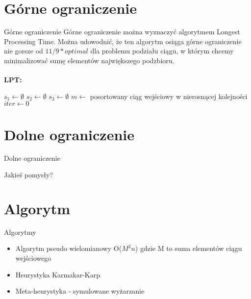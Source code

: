 \documentclass{beamer}
\begin{document}
\section{Górne ograniczenie}

\begin{frame}{Górne ograniczenie}
Górne ograniczenie można wyznaczyć algorytmem Longest Processing Time. Można udowodnić, że ten algorytm osiąga górne ograniczenie nie gorsze od $11/9*optimal$ dla problemu podziału ciągu, w którym chcemy minimalizować sumę elementów największego podzbioru.\\~\\
\textbf{LPT:}\\
\begin{algorithm}[H]
 $s_1 \gets \emptyset$\;
 $s_2 \gets \emptyset$\;
 $s_3 \gets \emptyset$\;
 $m \gets $ posortowany ciąg wejściowy w nierosnącej kolejności\;
 $iter \gets 0$\;
\end{algorithm} 

  

\end{frame}

\section{Dolne ograniczenie}

\begin{frame}{Dolne ograniczenie}

Jakieś pomysły?

\end{frame}

\section{Algorytm}

\begin{frame}{Algorytmy}


\begin{itemize}  
\item Algorytm pseudo wielomianowy O($M^2n$) gdzie M to suma elementów ciągu wejściowego
\item Heurystyka Karmakar-Karp
\item Meta-heurystyka - symulowane wyżarzanie
\end{itemize}

\end{frame}
\end{document}
